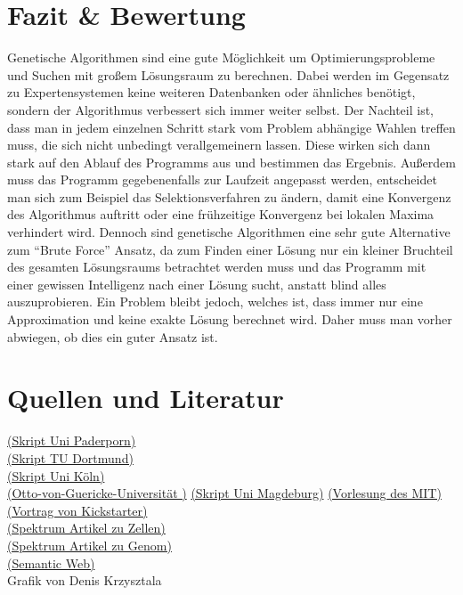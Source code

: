\section{Fazit \& Bewertung}
Genetische Algorithmen sind eine gute Möglichkeit um Optimierungsprobleme und Suchen mit großem Lösungsraum zu berechnen. Dabei werden im Gegensatz zu Expertensystemen keine weiteren Datenbanken oder ähnliches benötigt, sondern der Algorithmus verbessert sich immer weiter selbst. Der Nachteil ist, dass man in jedem  einzelnen Schritt stark vom Problem abhängige Wahlen treffen muss, die sich nicht unbedingt verallgemeinern lassen. Diese wirken sich dann stark auf den Ablauf des Programms aus und bestimmen das Ergebnis. Außerdem muss das Programm gegebenenfalls zur Laufzeit angepasst werden, entscheidet man  sich zum Beispiel das Selektionsverfahren zu ändern, damit eine Konvergenz des Algorithmus auftritt oder eine frühzeitige Konvergenz bei lokalen Maxima verhindert wird. Dennoch sind genetische Algorithmen eine sehr gute Alternative zum "`Brute Force"' Ansatz, da zum Finden einer Lösung nur ein kleiner Bruchteil des gesamten Lösungsraums betrachtet werden muss und das Programm mit einer gewissen Intelligenz nach einer Lösung sucht, anstatt blind alles auszuprobieren. Ein Problem bleibt jedoch, welches ist, dass immer nur eine Approximation und keine exakte Lösung berechnet wird. Daher muss man vorher abwiegen, ob dies ein guter Ansatz ist.

\section{Quellen und Literatur}

\href{http://www2.cs.uni-paderborn.de/cs/ag-klbue/de/courses/ws04/ea/students/ga_report.pdf}{(Skript Uni Paderporn)}\\
\href{http://www.mathematik.tu-dortmund.de/papers/MehmetiAmreinKulmsMacinLoenserBogonosWaidhas2014.pdf}{(Skript TU Dortmund)}\\
\href{http://www.spinfo.phil-fak.uni-koeln.de/fileadmin/spinfo/ki10/Genetische_algorithmen.pdf}{(Skript Uni Köln)}\\
\href{http://www.borgelt.net/slides/ga.pdf}{(Otto-von-Guericke-Universität )}
\href{http://www-e.uni-magdeburg.de/harbich/genetische_algorithmen/genetische_algorithmen.pdf}{(Skript Uni Magdeburg)}
\href{https://www.youtube.com/watch?v=kHyNqSnzP8Y}{(Vorlesung des MIT)}\\
\href{https://www.youtube.com/watch?v=6l6b78Y4V7Y}{(Vortrag von Kickstarter)}\\
\href{http://www.spektrum.de/lexikon/neurowissenschaft/zelle/14161}{(Spektrum Artikel zu Zellen)}\\
\href{http://www.spektrum.de/lexikon/biologie/genom/27365}{(Spektrum Artikel zu Genom)}\\
\href{http://semantic-web-grundlagen.de/w/images/e/e9/IntroAI-V06.pdf}{(Semantic Web)}\\
Grafik von Denis Krzysztala\\
